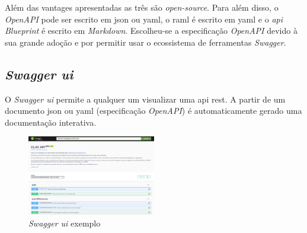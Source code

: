 Além das vantages apresentadas as três são \textit{open-source}. Para além disso, o \textit{OpenAPI} pode ser escrito em \acrshort{json} ou \acrshort{yaml}, o \acrshort{raml} é escrito em \acrshort{yaml} e o \textit{\acrshort{api} Blueprint} é escrito em \textit{Markdown}. Escolheu-se a especificação \textit{OpenAPI} devido à sua grande adoção e por permitir usar o ecossistema de ferramentas \textit{Swagger}.

\subsection{\textit{Swagger \acrshort{ui}}}

O \textit{Swagger \acrshort{ui}} permite a qualquer um visualizar uma \acrshort{api} \acrshort{rest}. A partir de um documento \acrshort{json} ou \acrshort{yaml} (especificação \textit{OpenAPI}) é automaticamente gerado uma documentação interativa.

\begin{figure}[H]
    \begin{center}
        \includegraphics[width=0.5\textwidth]{img/swaggerUI.png}
    \end{center}
    \caption{\textit{Swagger \acrshort{ui}} exemplo}
\end{figure}

